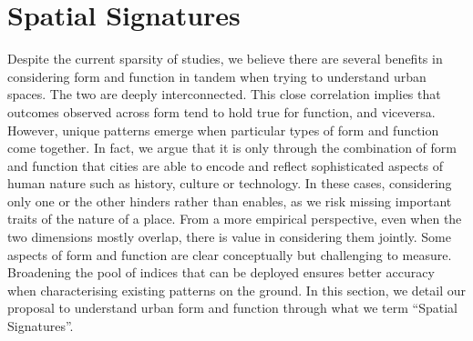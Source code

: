 \section{Spatial Signatures}
\label{sec:ss}

Despite the current sparsity of studies, we believe there are several benefits
in considering form and function in tandem when trying to understand urban
spaces.
The two are deeply interconnected. This close
correlation implies that outcomes observed across form tend to hold true for
function, and viceversa. However, unique patterns emerge when particular types
of form and function come together. 
In fact, we argue that it is only through the combination of form and function
that cities are able to encode and reflect sophisticated aspects of human
nature such as history, culture or technology.
%
In these cases, considering only one or the other hinders rather than enables,
as we risk missing important traits of the nature of a place.
From a more empirical perspective, even when the two dimensions mostly
overlap, there is value in considering them jointly. Some aspects of form and
function are clear conceptually but challenging to measure. Broadening the
pool of indices that can be deployed ensures better accuracy when
characterising existing patterns on the ground.
%
In this section, we detail our proposal to understand urban form and function
through what we term “Spatial Signatures”. 


